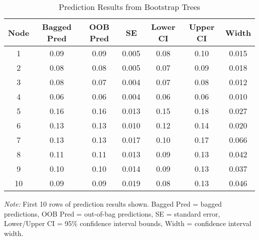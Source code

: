 \begin{table}[ht]
\footnotesize
\centering
\begin{tabular}{ccccccc}
 Node & Bagged Pred & OOB Pred & SE & Lower CI & Upper CI & Width \\ 
\midrule
 1 & 0.09 & 0.09 & 0.005 & 0.08 & 0.10 & 0.015 \\ 
  2 & 0.08 & 0.08 & 0.005 & 0.07 & 0.09 & 0.018 \\ 
  3 & 0.08 & 0.07 & 0.004 & 0.07 & 0.08 & 0.012 \\ 
  4 & 0.06 & 0.06 & 0.004 & 0.06 & 0.06 & 0.010 \\ 
  5 & 0.16 & 0.16 & 0.013 & 0.15 & 0.18 & 0.027 \\ 
  6 & 0.13 & 0.13 & 0.010 & 0.12 & 0.14 & 0.020 \\ 
  7 & 0.13 & 0.13 & 0.017 & 0.10 & 0.17 & 0.066 \\ 
  8 & 0.11 & 0.11 & 0.013 & 0.09 & 0.13 & 0.042 \\ 
  9 & 0.10 & 0.10 & 0.014 & 0.09 & 0.13 & 0.037 \\ 
  10 & 0.09 & 0.09 & 0.019 & 0.08 & 0.13 & 0.046 \\ 
  \end{tabular}
\caption*{\textit{Note:} First 10 rows of prediction results shown. Bagged Pred = bagged predictions, OOB Pred = out-of-bag predictions, SE = standard error, Lower/Upper CI = 95\% confidence interval bounds, Width = confidence interval width.}
\caption{Prediction Results from Bootstrap Trees} 
\label{tab:pred_results}
\end{table}
